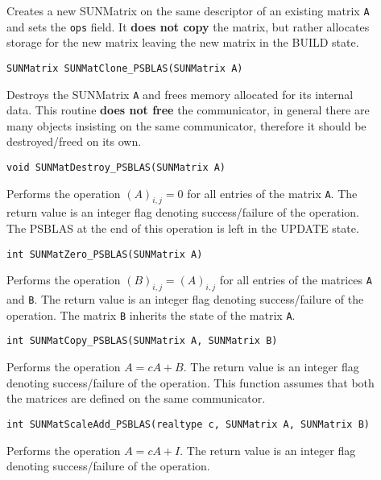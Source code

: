 \documentclass[twoside,a4paper]{refart}
\begin{document}
\begin{description}
\item[] Creates a new SUNMatrix on the same descriptor of an existing matrix \texttt{A} and sets
the \texttt{ops} field. It \textbf{does not copy} the matrix, but rather allocates storage for the new matrix leaving the new matrix in the BUILD state.

 \lstinline[style=CStyle]|SUNMatrix SUNMatClone_PSBLAS(SUNMatrix A)|

\item[] Destroys the SUNMatrix \texttt{A} and frees memory allocated for its internal data. This routine \textbf{does not free} the communicator, in general there are many objects insisting on the same communicator, therefore it should be destroyed/freed on its own.

 \lstinline[style=CStyle]|void SUNMatDestroy_PSBLAS(SUNMatrix A)|

\item[] Performs the operation $(A)_{i,j} = 0$ for all entries of the matrix \texttt{A}. The return value is an integer flag denoting success/failure of the operation. The PSBLAS at the end of this operation is left in the UPDATE state.

 \lstinline[style=CStyle]|int SUNMatZero_PSBLAS(SUNMatrix A)|

\item[] Performs the operation $(B)_{i,j} = (A)_{ i,j}$ for all entries of the matrices \texttt{A} and \texttt{B}. The return value is an integer flag denoting success/failure of the operation. The matrix \texttt{B} inherits the state of the matrix \texttt{A}.

 \lstinline[style=CStyle]|int SUNMatCopy_PSBLAS(SUNMatrix A, SUNMatrix B)|

\item[] Performs the operation $A = cA + B$. The return value is an integer flag denoting success/failure of the operation. This function assumes that both the matrices are defined on the same communicator.

 \lstinline[style=CStyle]|int SUNMatScaleAdd_PSBLAS(realtype c, SUNMatrix A, SUNMatrix B)|

\item[] Performs the operation $A = cA + I$. The return value is an integer flag denoting success/failure of the operation. 


\end{description}
\end{document}

